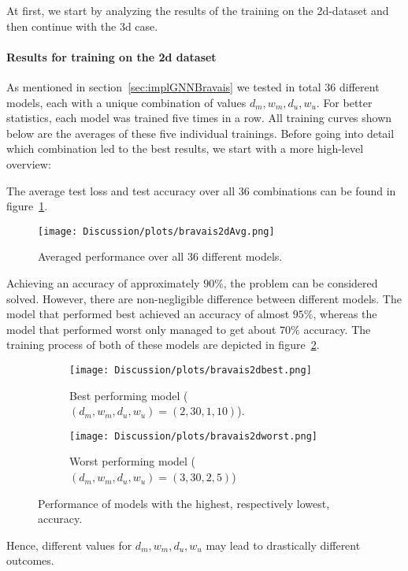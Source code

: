 At first, we start by analyzing the results of the training on the 2d-dataset and then continue with the 3d case.

\paragraph{Results for training on the 2d dataset}
As mentioned in section~\ref{sec:implGNNBravais} we tested in total 36 different models, each with a unique combination of values $d_m,w_m,d_u,w_u$.
For better statistics, each model was trained five times in a row.
All training curves shown below are the averages of these five individual trainings.
Before going into detail which combination led to the best results, we start 
with a more high-level overview:

The average test loss and test accuracy over all 36 combinations can be found in figure~\ref{fig:avgBravais2d}.
\begin{figure}[h]
    \centering
    \texttt{[image: Discussion/plots/bravais2dAvg.png]}
    \caption{Averaged performance over all 36 different models.}
    \label{fig:avgBravais2d}
\end{figure}
Achieving an accuracy of approximately $90\%$, the problem can be considered solved. 
However, there are non-negligible difference between different models. 
The model that performed best achieved an accuracy of almost $95\%$, whereas the model that performed worst
only managed to get about $70\%$ accuracy. The training process of both of these models are depicted in figure~\ref{fig:bravais2dBestWorst}.
\begin{figure}[h]
    \centering
    \begin{subfigure}[t]{0.45\textwidth}
        \centering
        \texttt{[image: Discussion/plots/bravais2dbest.png]}
        \caption{Best performing model ($(d_m,w_m,d_u,w_u)=(2, 30, 1, 10)$).}
    \end{subfigure}
    \hfill
    \begin{subfigure}[t]{0.45\textwidth}
        \centering
        \texttt{[image: Discussion/plots/bravais2dworst.png]}
        \caption{Worst performing model ($(d_m,w_m,d_u,w_u)=(3, 30, 2, 5)$)}
    \end{subfigure}
    \caption{Performance of models with the highest, respectively lowest, accuracy.}
    \label{fig:bravais2dBestWorst}    
\end{figure}
Hence, different values for $d_m,w_m,d_u,w_u$ may lead to drastically different outcomes. 

